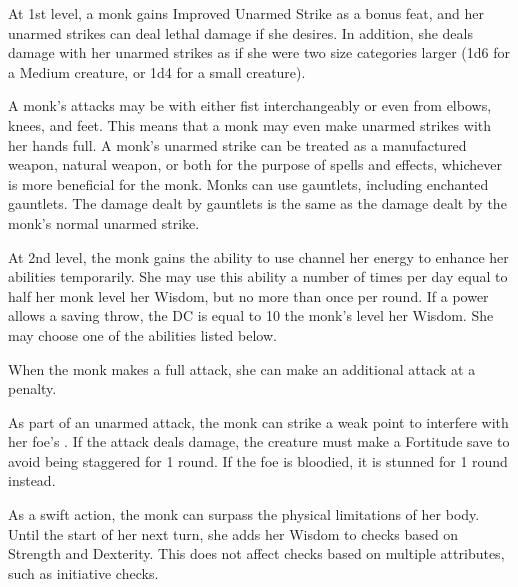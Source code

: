 \begin{comment}  %
 \cfnl{\Ki Ward (Ex)}\label{Mnk:Ki Ward (Ex)} When unarmored and unencumbered, a monk gains a \plus1 armor bonus to AC at 2nd level. This bonus increases by 1 for every two monk levels thereafter (\plus2 at 4th, \plus3 at 6th, etc.).

\par The monk loses this bonus when she is
immobilized or helpless, when she wears any armor, when she carries a shield, or when she carries a medium or heavy load.
\end{comment}

 At 1st level, a monk gains Improved Unarmed Strike as a bonus feat, and her unarmed strikes can deal lethal damage if she desires. In addition, she deals damage with her unarmed strikes as if she were two size categories larger (1d6 for a Medium creature, or 1d4 for a small creature).

A monk's attacks may be with either fist interchangeably or even from elbows, knees, and feet. This means that a monk may even make unarmed strikes with her hands full. A monk's unarmed strike can be treated as a manufactured weapon, natural weapon, or both for the purpose of spells and effects, whichever is more beneficial for the monk. Monks can use gauntlets, including enchanted gauntlets. The damage dealt by gauntlets is the same as the damage dealt by the monk's normal unarmed strike.

 At 2nd level, the monk gains the ability to use channel her \ki energy to enhance her abilities temporarily. She may use this ability a number of times per day equal to half her monk level \add her Wisdom, but no more than once per round. If a \ki power allows a saving throw, the DC is equal to 10 \add the monk's level \add her Wisdom. She may choose one of the abilities listed below.

 When the monk makes a full attack, she can make an additional attack at a  penalty.

 As part of an unarmed attack, the monk can strike a weak point to interfere with her foe's \ki. If the attack deals damage, the creature must make a Fortitude save to avoid being staggered for 1 round. If the foe is bloodied, it is stunned for 1 round instead.

 As a swift action, the monk can surpass the physical limitations of her body. Until the start of her next turn, she adds her Wisdom to checks based on Strength and Dexterity. This does not affect checks based on multiple attributes, such as initiative checks.

